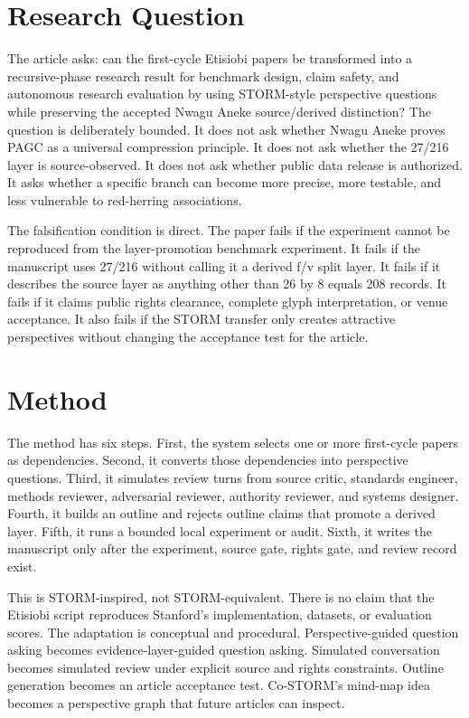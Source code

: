 \documentclass[sigconf,nonacm]{acmart}
\begin{document}
\section{Research Question}
The article asks: can the first-cycle Etisiobi papers be transformed into a
recursive-phase research result for benchmark design, claim safety, and autonomous research evaluation by using STORM-style perspective
questions while preserving the accepted Nwagu Aneke source/derived distinction?
The question is deliberately bounded. It does not ask whether Nwagu Aneke proves
PAGC as a universal compression principle. It does not ask whether the 27/216
layer is source-observed. It does not ask whether public data release is
authorized. It asks whether a specific branch can become more precise, more
testable, and less vulnerable to red-herring associations.

The falsification condition is direct. The paper fails if the experiment cannot
be reproduced from the layer-promotion benchmark experiment. It fails if the manuscript uses 27/216 without
calling it a derived f/v split layer. It fails if it describes the source layer
as anything other than 26 by 8 equals 208 records. It fails if it claims public
rights clearance, complete glyph interpretation, or venue acceptance.
It also fails if the STORM transfer only creates attractive perspectives without
changing the acceptance test for the article.

\section{Method}
The method has six steps. First, the system selects one or more first-cycle
papers as dependencies. Second, it converts those dependencies into perspective
questions. Third, it simulates review turns from source critic, standards
engineer, methods reviewer, adversarial reviewer, authority reviewer, and
systems designer. Fourth, it builds an outline and rejects outline claims that
promote a derived layer. Fifth, it runs a bounded local experiment or audit.
Sixth, it writes the manuscript only after the experiment, source gate, rights
gate, and review record exist.

This is STORM-inspired, not STORM-equivalent. There is no claim that the
Etisiobi script reproduces Stanford's implementation, datasets, or evaluation
scores. The adaptation is conceptual and procedural. Perspective-guided question
asking becomes evidence-layer-guided question asking. Simulated conversation
becomes simulated review under explicit source and rights constraints. Outline
generation becomes an article acceptance test. Co-STORM's mind-map idea becomes
a perspective graph that future articles can inspect.
\end{document}
